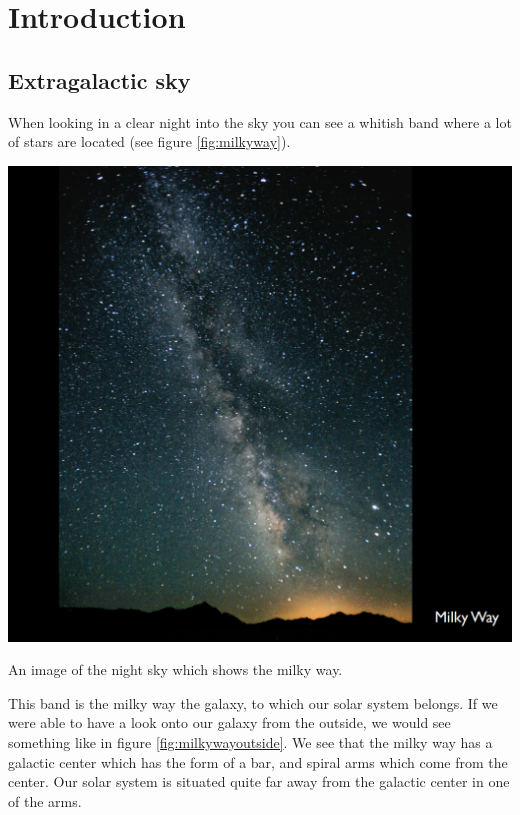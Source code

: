 \chapter{Introduction}

\section{Extragalactic sky}
When looking in a clear night into the sky you can see a whitish band where a lot of stars are located (see figure \ref{fig:milkyway}). 
\begin{marginfigure}
	\centering
		\includegraphics[width=\textwidth]{img/ch-01/milkyway.png}
		\caption{An image of the night sky which shows the milky way.}
		\label{fig:milkyway}
\end{marginfigure}
This band is the milky way the galaxy, to which our solar system belongs. If we were able to have a look onto our galaxy from the outside, we would see something like in figure \ref{fig:milkywayoutside}. We see that the milky way has a galactic center which has the form of a bar, and spiral arms which come from the center. Our solar system is situated quite far away from the galactic center in one of the arms. 
